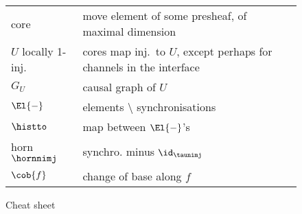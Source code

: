 \documentclass{LMCS}
\theoremstyle{plain}\newtheorem{satz}[thm]{Satz}
\begin{document}
\begin{figure}[p]
\begin{multicols}{2}
\begin{tabular}{lp{.7\linewidth}}
        core & move element of some presheaf, of maximal dimension \\
        $U$ locally 1-inj. & cores map inj.\ to $U$, except 
        perhaps for channels in the interface  \\
        $G_U$ & causal graph of $U$ \\
        $\El{-}$ & elements $\setminus$ synchronisations \\
        $\histto$ & map between $\El{-}$'s \\
        horn $\hornnimj$ & synchro. minus $\id_{\taunimj}$ \\
        $\cob{f}$ & change of base along $f$
      \end{tabular}
    \end{multicols}
    \caption{Cheat sheet}
\label{fig:cheat}
\end{figure}
\end{document}
